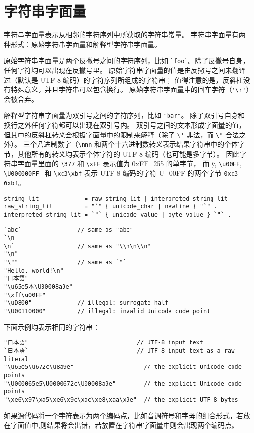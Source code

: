 
\section{字符串字面量}
字符串字面量表示从相邻的字符序列中所获取的字符串常量。
字符串字面量有两种形式：原始字符串字面量和解释型字符串字面量。

原始字符串字面量是两个反撇号之间的字符序列，比如 \lstinline|`foo`|。除了反撇号自身，任何字符均可以出现在反撇号里。
原始字符串字面量的值是由反撇号之间未翻译过（默认是 UTF-8 编码）的字符序列所组成的字符串；
值得注意的是，反斜杠没有特殊意义，并且字符串可以包含换行。
原始字符串字面量中的回车字符（\lstinline|'\r'|）会被舍弃。

解释型字符串字面量为双引号之间的字符序列，比如 \lstinline|"bar"|。
除了双引号自身和换行之外任何字符都可以出现在双引号内。
双引号之间的文本形成字面量的值，但其中的反斜杠转义会根据\rune{}字面量中的限制来解释（除了 \lstinline|\'| 非法，而 \lstinline|\"| 合法之外）。
三个八进制数字（\lstinline|\nnn| 和两个十六进制数转义表示结果字符串中的个体字节，其他所有的转义均表示个体字符的 UTF-8 编码（也可能是多字节）。
因此字符串字面量里面的 \lstinline|\377| 和 \lstinline|\xFF| 表示值为 0xFF=255 的单字节，
而 \"y, \lstinline|\u00FF|, \lstinline|\U000000FF | 和 \lstinline|\xc3\xbf| 表示 UTF-8 编码的字符 U+00FF 的两个字节 \lstinline|0xc3 0xbf|。

\begin{lstlisting}[style=EBNF]
string_lit             = raw_string_lit | interpreted_string_lit .
raw_string_lit         = "`" { unicode_char | newline } "`" .
interpreted_string_lit = `"` { unicode_value | byte_value } `"` .
\end{lstlisting}

\begin{lstlisting}[style=golang]
`abc`                // same as "abc"
`\n
\n`					 // same as "\\n\n\\n"
"\n"
"\""                 // same as `"`
"Hello, world!\n"
"日本語"
"\u65e5本\U00008a9e"
"\xff\u00FF"
"\uD800"             // illegal: surrogate half
"\U00110000"         // illegal: invalid Unicode code point
\end{lstlisting}
下面示例均表示相同的字符串：
\begin{lstlisting}[style=golang]
"日本語"								// UTF-8 input text
`日本語`								// UTF-8 input text as a raw literal
"\u65e5\u672c\u8a9e"                    // the explicit Unicode code points
"\U000065e5\U0000672c\U00008a9e"        // the explicit Unicode code points
"\xe6\x97\xa5\xe6\x9c\xac\xe8\xaa\x9e"  // the explicit UTF-8 bytes
\end{lstlisting}
如果源代码将一个字符表示为两个编码点，比如音调符号和字母的组合形式，若放在\rune{}字面值中,则结果将会出错，若放置在字符串字面量中则会出现两个编码点。
